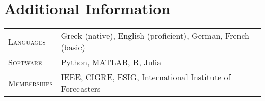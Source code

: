 \documentclass[11pt,a4paper]{article}
\makeatletter
\newlength{\datecolwidth}
\newenvironment{entrylist}{%
  \begin{longtable}{@{}p{\datecolwidth}@{\hspace{0.8em}}p{\dimexpr\linewidth-\datecolwidth-0.8em\relax}@{}}%
}{\end{longtable}}
\newcommand{\entry}[4]{%
  \textbf{#1} & \textbf{#2}\\[-0.2em]
              & {\itshape #3}\\[-0.2em]
              & #4\\[0.8em]
}
\newcommand{\supervision}[4]{%
  \textbf{#1} & \textbf{#2} ({#3}) \\[-0.2em]
                 & \emph{#4} \\[0.8em]
}
\newcommand{\labelstyle}[1]{\textsc{#1}}   %
\newcommand{\entrylabel}[2]{%
  \labelstyle{#1} & #2\\[0.8em]
}
\makeatother
\begin{document}



\section*{Additional Information}
\begin{entrylist}
    \entrylabel{Languages}{
      Greek (native), English (proficient), German, French (basic)}
      \entrylabel{Software}{
      Python, MATLAB, R, Julia}
      \entrylabel{Memberships}{
      IEEE, CIGRE, ESIG, International Institute of Forecasters
  }

\end{entrylist}

\end{document}
